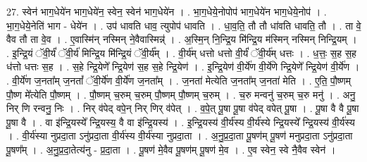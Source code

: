 \documentclass[17pt]{extarticle}
\begin{document}
27. स्वेन॑ भाग॒धेये॑न भाग॒धेये॑न॒ स्वेन॒ स्वेन॑ भाग॒धेये॑न । . भा॒ग॒धेये॒नोपोप॑ भाग॒धेये॑न भाग॒धेये॒नोप॑ । . भा॒ग॒धेये॒नेति॑ भाग - धेये॑न । . उप॑ धावति धाव॒ त्युपोप॑ धावति । . धा॒व॒ति॒ तौ तौ धा॑वति धावति॒ तौ । . ता वे॒ वैव तौ ता वे॒व । . ए॒वास्मि॑न् नस्मिन् ने॒वैवास्मिन्न्॑ । . अ॒स्मि॒न् नि॒न्द्रि॒य मि॑न्द्रि॒य म॑स्मिन् नस्मिन् निन्द्रि॒यम् । . इ॒न्द्रि॒यं ॅवी॒र्यं॑ ॅवी॒र्य॑ मिन्द्रि॒य मि॑न्द्रि॒यं ॅवी॒र्य᳚म् । . वी॒र्य॑म् धत्तो धत्तो वी॒र्यं॑ ॅवी॒र्य॑म् धत्तः । . ध॒त्तः॒ स॒ह स॒ह ध॑त्तो धत्तः स॒ह । . स॒हे न्द्रि॒येणे᳚ न्द्रि॒येण॑ स॒ह स॒हे न्द्रि॒येण॑ । . इ॒न्द्रि॒येण॑ वी॒र्ये॑ण वी॒र्ये॑णे न्द्रि॒येणे᳚ न्द्रि॒येण॑ वी॒र्ये॑ण । . वी॒र्ये॑ण ज॒नता᳚म् ज॒नतां᳚ ॅवी॒र्ये॑ण वी॒र्ये॑ण ज॒नता᳚म् । . ज॒नता॑ मेत्येति ज॒नता᳚म् ज॒नता॑ मेति । . ए॒ति॒ पौ॒ष्णम् पौ॒ष्ण मे᳚त्येति पौ॒ष्णम् । . पौ॒ष्णम् च॒रुम् च॒रुम् पौ॒ष्णम् पौ॒ष्णम् च॒रुम् । . च॒रु मन्वनु॑ च॒रुम् च॒रु मनु॑ । . अनु॒ निर् णि रन्वनु॒ निः । . निर् व॑पेद् वपे॒न् निर् णिर् व॑पेत् । . व॒पे॒त् पू॒षा पू॒षा व॑पेद् वपेत् पू॒षा । . पू॒षा वै वै पू॒षा पू॒षा वै । . वा इ॑न्द्रि॒यस्ये᳚ न्द्रि॒यस्य॒ वै वा इ॑न्द्रि॒यस्य॑ । . इ॒न्द्रि॒यस्य॑ वी॒र्य॑स्य वी॒र्य॑स्ये न्द्रि॒यस्ये᳚ न्द्रि॒यस्य॑ वी॒र्य॑स्य । . वी॒र्य॑स्या नुप्रदा॒ता ऽनु॑प्रदा॒ता वी॒र्य॑स्य वी॒र्य॑स्या नुप्रदा॒ता । . अ॒नु॒प्र॒दा॒ता पू॒षण॑म् पू॒षण॑ मनुप्रदा॒ता ऽनु॑प्रदा॒ता पू॒षण᳚म् । . अ॒नु॒प्र॒दा॒तेत्य॑नु - प्र॒दा॒ता । . पू॒षण॑ मे॒वैव पू॒षण॑म् पू॒षण॑ मे॒व । . ए॒व स्वेन॒ स्वे नै॒वैव स्वेन॑ । \newline
\end{document}
